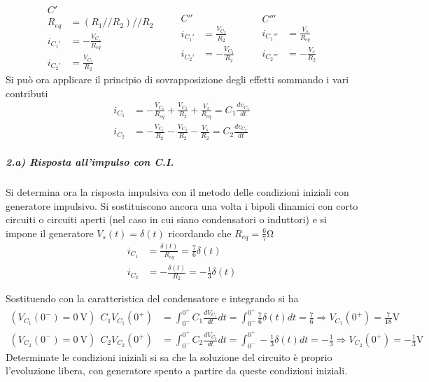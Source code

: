 $$
\begin{aligned}
C' & \\
R_{eq} &= (R_1//R_2)//R_2\\
i_{C_1'} &= - \frac{V_{C_1}}{R_{eq}} \\
i_{C_2'} &= \frac{V_{C_1}}{R_2}
\end{aligned}
\qquad
\begin{aligned}
C'' & \\
i_{C_1'} &= \frac{V_{C_2}}{R_2}\\
i_{C_2'} &= -\frac{V_{C_2}}{R_2}
\end{aligned}
\qquad
\begin{aligned}
C''' & \\
i_{C_1'''} &= \frac{V_s}{R_{eq}} \\
i_{C_2'''} &= -\frac{V_s}{R_2}
\end{aligned}
$$
Si può ora applicare il principio di sovrapposizione degli effetti
sommando i vari contributi
$$
\begin{aligned}
i_{C_1} & = -\frac{V_{C_1}}{R_{eq}} + \frac{V_{C_2}}{R_2} + \frac{V_s}{R_{eq}} =
C_1\frac{dv_{C_1}}{dt}\\
i_{C_2} & = -\frac{V_{C_1}}{R_2} - \frac{V_{C_2}}{R_2} - \frac{V_s}{R_2} =
C_2\frac{dv_{C_2}}{dt}
\end{aligned}
$$
\subparagraph{2.a) Risposta all'impulso con C.I.}
Si determina ora la risposta impulsiva con il metodo delle condizioni iniziali con 
generatore impulsivo.
Si sostituiscono ancora una volta i bipoli dinamici con corto circuiti o circuiti
aperti (nel caso in cui siano condensatori o induttori) e si impone il generatore
$V_s(t) = \delta(t)$ ricordando che $R_{eq}=\frac{6}{7}\si{\ohm}$
\begin{align*}
i_{C_1} &= \frac{\delta(t)}{R_{eq}} = \frac{7}{6}\delta(t)\\
i_{C_2} &= -\frac{\delta(t)}{R_2} = -\frac{1}{3}\delta(t)
\end{align*}

Sostituendo con la caratteristica del condensatore e integrando si ha
\begin{align*}
\left(V_{C_1}(0^-) = \SI{0}{\volt}\right)\ \ C_1V_{C_1}(0^+) &=\int_{0^-}^{0^+}C_1\frac{dV_{C_1}}{dt}dt = \int_{0^-}^{0^+}\frac{7}{6}\delta(t)dt = \frac{7}{6} \Rightarrow V_{C_1}(0^+) = \frac{7}{18}\si{\volt}\\
\left(V_{C_2}(0^-) = \SI{0}{\volt}\right)\ \ C_2V_{C_2}(0^+) & = \int_{0^-}^{0^+} C_2 \frac{dV_{C_2}}{dt}dt =
\int_{0^-}^{0^+} -\frac{1}{3}\delta(t) dt = -\frac{1}{3} \Rightarrow V_{C_2}(0^+) = -\frac{1}{3}\si{\volt}
\end{align*}
Determinate le condizioni iniziali si sa che la soluzione del circuito è proprio
l'evoluzione libera, con generatore spento a partire da queste condizioni iniziali.

